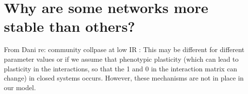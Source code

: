 \section{Why are some networks more stable than others?}



From Dani re: community collpase at low IR : This may be different for different parameter values or if we assume that phenotypic plasticity (which can lead to plasticity in the interactions, so that the 1 and 0 in the interaction matrix can change) in closed systems occurs. However, these mechanisms are not in place in our model.